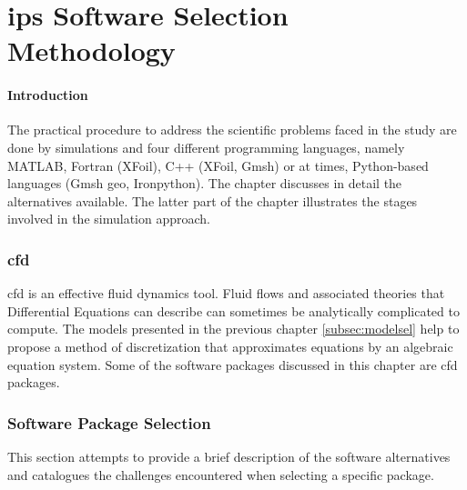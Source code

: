 \documentclass[english]{kththesis}
\begin{document}
\chapter{\acrshort{ips} Software Selection Methodology}
\label{ch:IPSsoft}
\subsubsection{Introduction}
The practical procedure to address the scientific problems faced in the study are done by simulations and four different programming languages, namely MATLAB, Fortran (XFoil), C++ (XFoil, Gmsh) or at times, Python-based languages (Gmsh geo, Ironpython). The chapter discusses in detail the alternatives available. The latter part of the chapter illustrates the stages involved in the simulation approach.

\subsection{\acrfull{cfd}}
\label{sec:cfd}
\acrshort{cfd} is an effective fluid dynamics tool. Fluid flows and associated theories that Differential Equations can describe can sometimes be analytically complicated to compute. The models presented in the previous chapter \ref{subsec:modelsel} help to propose a method of discretization that approximates equations by an algebraic equation system. Some of the software packages discussed in this chapter are \acrshort{cfd} packages.

\subsection{Software Package Selection}
\label{subsec:softpaksel}
This section attempts to provide a brief description of the software alternatives and catalogues the challenges encountered when selecting a specific package.
\end{document}
